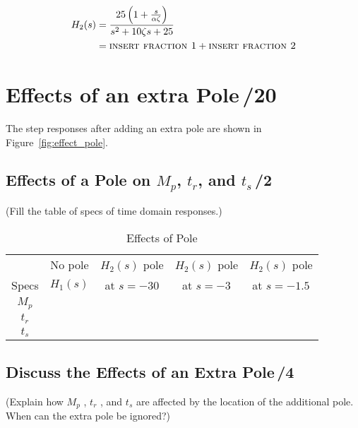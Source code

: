 \documentclass{article}
\newcommand{\score}{\hfill \underline{\hspace{0.65cm}}\,/} %
\begin{document}
\begin{align*}
H_2(s) &=\frac{25 \left( 1+\frac{s}{\alpha \zeta} \right)}{s^2+10\zeta s +25}\\
       &= \mbox{\sc insert fraction 1} + \mbox{\sc insert fraction 2}
\end{align*}

\section{{\sc Effects of an extra Pole}\score 20}
The step responses after adding an extra pole are shown in Figure~\ref{fig:effect_pole}.

\subsection{Effects of a Pole on $M_p$, $t_r$, and $t_s$\score 2}
(Fill the table of specs of time domain responses.)
\begin{table}[phtb]
\begin{center}
\caption{Effects of Pole}
 \label{tbl:lab2_q3}
\begin{tabular}{c|c|c|c|c} \hline \hline
\rowcolor{Grey} & No pole & $H_2(s)$ pole & $H_2(s)$ pole & $H_2(s)$ pole \\
\rowcolor{Grey} Specs &  $H_1(s)$ &  at $s = -30$ &  at $s = -3$ & at $s = -1.5$ \\ \hline   
$M_p$ &  &  &  &  \\ \hline
$t_r$ &  &  &  &  \\ \hline
$t_s$ &  &  &  &  \\ \hline
\end{tabular}
\end{center}
\end{table}

\subsection{Discuss the Effects of an Extra Pole\score 4}
(Explain how $M_p$ , $t_r$ , and $t_s$ are affected by the location of the additional pole. When can the extra pole be ignored?)
\end{document}
